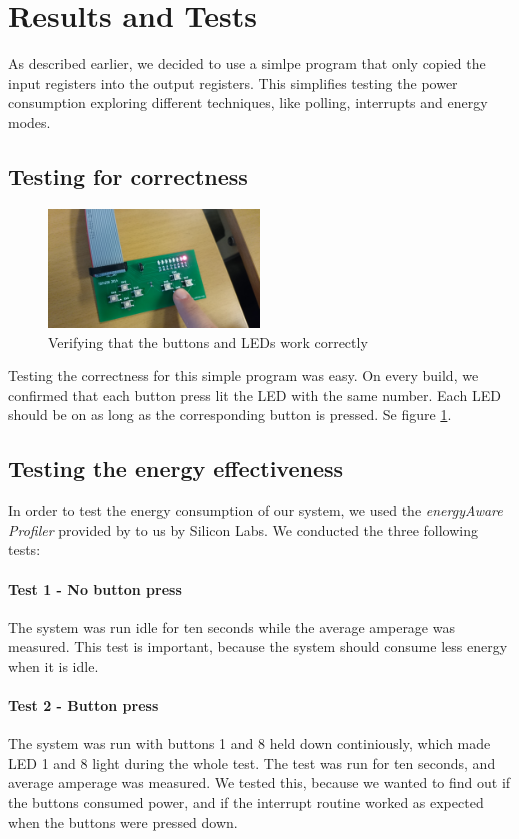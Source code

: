 \section{Results and Tests}
As described earlier, we decided to use a simlpe program that only copied the input registers into the output registers. This simplifies testing the power consumption exploring different techniques, like polling, interrupts and energy modes. 

	\subsection{Testing for correctness}
	\begin{figure}[t]
		\centerline{
			\includegraphics[width=0.5\textwidth]{img/test_correctness.jpg}
		}
		\caption{Verifying that the buttons and LEDs work correctly}
		\label{fig:test_correctness}
	\end{figure}
Testing the correctness for this simple program was easy. On every build, we confirmed that each button press lit the LED with the same number. Each LED should be on as long as the corresponding button is pressed. Se figure \ref{fig:test_correctness}.

	\subsection{Testing the energy effectiveness}
	In order to test the energy consumption of our system, we used the \emph{energyAware Profiler} provided by to us by Silicon Labs. We conducted the three following tests:

		\paragraph{Test 1 - No button press} 
		The system was run idle for ten seconds while the average amperage was measured. This test is important, because the system should consume less energy when it is idle.

		\paragraph{Test 2 - Button press}
		The system was run with buttons 1 and 8 held down continiously, which made LED 1 and 8 light during the whole test. The test was run for ten seconds, and average amperage was measured. We tested this, because we wanted to find out if the buttons consumed power, and if the interrupt routine worked as expected when the buttons were pressed down.

